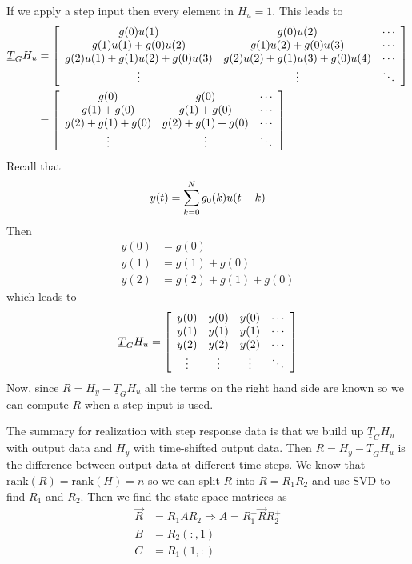 If we apply a step input then every element in $H_u = 1$. This leads to
\begin{align*}
\underline{T}_GH_u &= \left[\begin{array}{c c c}
g(0)u(1) & g(0)u(2) & \cdots \\
g(1)u(1)+g(0)u(2) & g(1)u(2)+g(0)u(3) & \cdots \\
g(2)u(1)+g(1)u(2)+g(0)u(3) & g(2)u(2)+g(1)u(3)+g(0)u(4) & \cdots \\
\vdots & \vdots & \ddots
\end{array}\right] \\
&= \left[\begin{array}{c c c}
g(0) & g(0) & \cdots \\
g(1)+g(0) & g(1)+g(0) & \cdots \\
g(2)+g(1)+g(0) & g(2)+g(1)+g(0) & \cdots \\
\vdots & \vdots & \ddots
\end{array}\right]
\end{align*}
Recall that
$$y(t)=\sum_{k=0}^N g_0(k)u(t-k)$$
Then
\begin{align*}
y(0) &= g(0) \\
y(1) &= g(1) + g(0) \\
y(2) &= g(2) + g(1) + g(0)
\end{align*}
which leads to
\begin{align*}
\underline{T}_GH_u = \left[\begin{array}{c c c c}
y(0) & y(0) & y(0) & \cdots \\
y(1) & y(1) & y(1) & \cdots \\
y(2) & y(2) & y(2) & \cdots \\
\vdots & \vdots & \vdots & \ddots
\end{array}\right]
\end{align*}
Now, since $R=H_y-\underline{T}_GH_u$ all the terms on the right hand side are known so we can compute $R$ when a step input is used.

The summary for realization with step response data is that we build up $\underline{T}_GH_u$ with output data and $H_y$ with time-shifted output data. Then $R=H_y-\underline{T}_GH_u$ is the difference between output data at different time steps. We know that $\text{rank}(R)=\text{rank}(H)=n$ so we can split $R$ into $R=R_1R_2$ and use SVD to find $R_1$ and $R_2$. Then we find the state space matrices as
\begin{align*}
\vec{R} &= R_1AR_2 \Rightarrow A=R_1^+\vec{R}R_2^+ \\
B &= R_2(:,1) \\
C &= R_1(1,:)
\end{align*}

